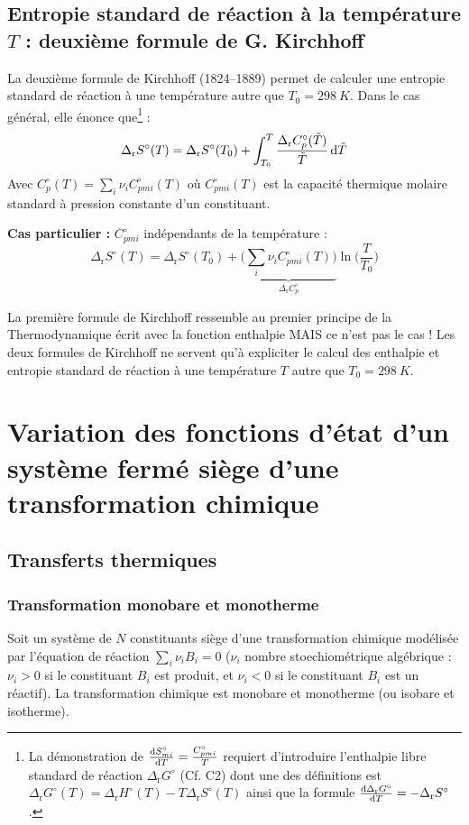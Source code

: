 \documentclass{article}
\newcommand{\Dr}{\Delta_{\mathrm{r}}}
\begin{document}
\subsection{Entropie standard de réaction à la température $T$ : deuxième formule de G. Kirchhoff}
La deuxième formule de Kirchhoff (1824--1889) permet de calculer une entropie standard de réaction à une température autre que $T_0= \SI{298}{K}$. Dans le cas général, elle énonce que\footnote{La démonstration de $\dv{S_{mi}^\circ}{T} = \frac{C_{pmi}^\circ}{T}$ requiert d’introduire l’enthalpie libre standard de réaction $\Dr G^\circ$ (Cf. C2) dont une des définitions est $\Dr G^\circ(T) = \Dr H^\circ(T) -T\Dr S^\circ(T)$ ainsi que la formule $\dv{\Dr G^\circ}{T} = -\Dr S^\circ$.} :
\begin{equation*}
    \Dr S^\circ (T) =\Dr S^\circ (T_0) + \int_{T_0}^T \frac{\Dr C_p^\circ (\Tilde{T})}{\Tilde{T}} \dd{\Tilde{T}}
\end{equation*}
Avec $C_p^\circ (T)=\sum_i\nu_i C_{pmi}^\circ(T)$ où $C_{pmi}^\circ(T)$ est la capacité thermique molaire standard à pression constante d'un constituant.

\begin{tableau}
        \textbf{Cas particulier :} $C_{pmi}^\circ$ indépendants de la température :
    $$\Dr S^\circ (T) =\Dr S^\circ (T_0) + \underbrace{\bigg(\sum_i\nu_i C_{pmi}^\circ(T)\bigg)}_{\Dr C_p^\circ}\ln\bigg(\frac{T}{T_0}\bigg)$$
    
    \begin{attention}
        La première formule de Kirchhoff ressemble au premier principe de la Thermodynamique écrit avec la fonction enthalpie MAIS ce n’est pas le cas ! Les deux formules de Kirchhoff ne servent qu’à expliciter le calcul des enthalpie et entropie standard de réaction à une température $T$ autre que $T_0 = \SI{298}{K}$.
    \end{attention}
\end{tableau}

\section{Variation des fonctions d’état d’un système fermé siège d’une transformation chimique}
\subsection{Transferts thermiques}
\subsubsection{Transformation monobare et monotherme}
Soit un système de $N$ constituants siège d’une transformation chimique modélisée par l’équation de réaction $\sum_i\nu_iB_i=0$ ($\nu_i$ nombre stoechiométrique algébrique : $\nu_i>0$ si le constituant $B_i$ est produit, et $\nu_i<0$ si le constituant $B_i$ est un réactif). La transformation chimique est monobare et monotherme (ou isobare et isotherme).
\end{document}
